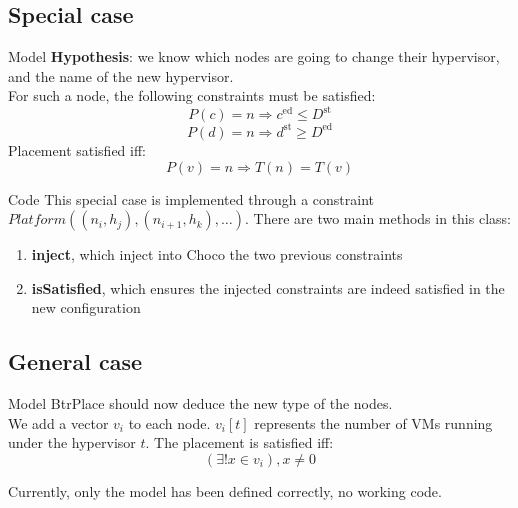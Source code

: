 \documentclass{beamer}
\begin{document}
\subsection{Special case}
\begin{frame}{Model}
\textbf{Hypothesis}: we know which nodes are going to change their hypervisor,
and the name of the new hypervisor.\\
 For such a node, the following constraints must be satisfied:
\[
	P(c) = n \Rightarrow c^\mathrm{ed} \leq D^\mathrm{st}
\]
\[
	P(d) = n \Rightarrow d^\mathrm{st} \geq D^\mathrm{ed}
\]
 Placement satisfied iff:
\[
	P(v) = n \Rightarrow T(n) = T(v)	
\]

\end{frame}
\begin{frame}{Code}
This special case is implemented through a constraint
$Platform((n_i, h_j), (n_{i+1}, h_k), \ldots)$.
There are two main methods in this class:
\begin{enumerate}
	\item{\textbf{inject}}, which inject into Choco the two previous
		constraints
	\item{\textbf{isSatisfied}}, which ensures the injected constraints
		are indeed satisfied in the new configuration
\end{enumerate}
\end{frame}

\subsection{General case}
\begin{frame}{Model}
BtrPlace should now deduce the new type of the nodes.\\
We add a vector $v_i$ to each node. $v_i[t]$ represents the number
of VMs running under the hypervisor $t$.
 The placement is satisfied iff:
\[
	(\exists ! x \in v_i), x \neq 0
\]

Currently, only the model has been defined correctly, no working code.
\end{frame}

\end{document}
